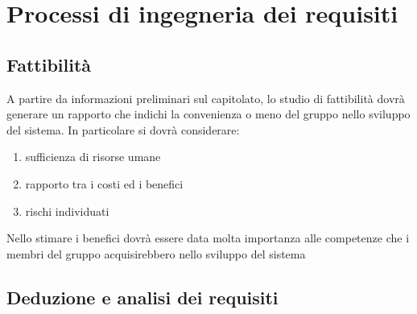 \section{Processi di ingegneria dei requisiti}{
	\subsection{Fattibilità}{
		A partire da informazioni preliminari sul capitolato, lo studio di fattibilità dovrà generare un rapporto che indichi la convenienza o meno del gruppo nello sviluppo del sistema. In particolare si dovrà considerare:
		\begin{enumerate}
			\item sufficienza di risorse umane
			\item rapporto tra i costi ed i benefici
			\item rischi individuati
		\end{enumerate}
		Nello stimare i benefici dovrà essere data molta importanza alle competenze che i membri del gruppo acquisirebbero nello sviluppo del sistema
	 }
	\subsection{Deduzione e analisi dei requisiti}{ 
}}
